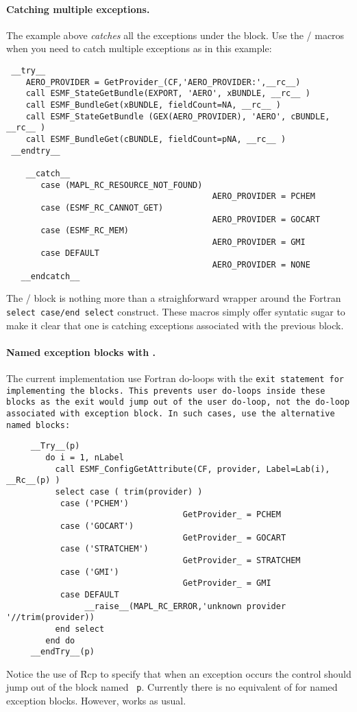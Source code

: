 \paragraph{Catching multiple exceptions.}

The example above {\em catches} all the exceptions under the
 block. Use the / macros when you need
to catch multiple exceptions as in this example:
\begin{verbatim}
 __try__
    AERO_PROVIDER = GetProvider_(CF,'AERO_PROVIDER:',__rc__)
    call ESMF_StateGetBundle(EXPORT, 'AERO', xBUNDLE, __rc__ )
    call ESMF_BundleGet(xBUNDLE, fieldCount=NA, __rc__ )
    call ESMF_StateGetBundle (GEX(AERO_PROVIDER), 'AERO', cBUNDLE, __rc__ )
    call ESMF_BundleGet(cBUNDLE, fieldCount=pNA, __rc__ )
 __endtry__
 
    __catch__
       case (MAPL_RC_RESOURCE_NOT_FOUND) 
                                          AERO_PROVIDER = PCHEM
       case (ESMF_RC_CANNOT_GET) 
                                          AERO_PROVIDER = GOCART
       case (ESMF_RC_MEM)
                                          AERO_PROVIDER = GMI
       case DEFAULT
                                          AERO_PROVIDER = NONE
   __endcatch__
\end{verbatim}
The / block is nothing more than a straighforward
wrapper around the Fortran {\tt select case/end select}
construct. These macros simply offer syntatic sugar to make it clear
that one is catching exceptions associated with the previous  block.

\paragraph{Named exception blocks with . } The current
implementation use Fortran do-loops with the \tt {exit} statement 
for implementing the  blocks. This prevents user do-loops
inside these blocks as the {\tt exit} would jump out of the user
do-loop, not the do-loop associated with exception block. In such
cases, use the alternative named  blocks:
\begin{verbatim}
     __Try__(p)
        do i = 1, nLabel
          call ESMF_ConfigGetAttribute(CF, provider, Label=Lab(i), __Rc__(p) )
          select case ( trim(provider) )
           case ('PCHEM')
                                    GetProvider_ = PCHEM
           case ('GOCART')
                                    GetProvider_ = GOCART
           case ('STRATCHEM')
                                    GetProvider_ = STRATCHEM
           case ('GMI')
                                    GetProvider_ = GMI
           case DEFAULT
                __raise__(MAPL_RC_ERROR,'unknown provider '//trim(provider))
          end select
        end do
     __endTry__(p)
\end{verbatim}
Notice the use of \f{Rc}{p} to specify that when an exception
occurs the control should jump out of the  block named {\tt
  p}. Currently there is no equivalent of  for named
exception blocks. However,  works as usual.

